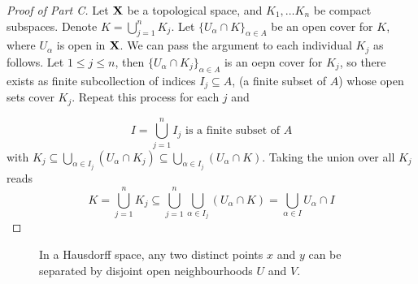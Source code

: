 \documentclass[../main-manifolds.tex]{subfiles}
\begin{document}
\begin{proof}[Proof of  Part C]
    Let ${\mathbf{X}}$ be a topological space, and $K_1,\ldots K_n$ be compact subspaces. Denote $K = \bigcup_{j=1}^n K_j$. Let $\{U_\alpha\cap K\}_{\alpha\in A}$ be an open cover for $K$, where $U_\alpha$ is open in ${\mathbf{X}}$. We can pass the argument to each individual $K_j$ as follows. Let $1\leq j\leq n$, then $\{U_\alpha\cap K_j\}_{\alpha\in A}$ is an oepn cover for $K_j$, so there exists as finite subcollection of indices $I_j\subseteq A$, (a finite subset of $A$) whose open sets cover $K_j$. Repeat this process for each $j$ and 

    \[
        I = \bigcup_{j=1}^n I_j \text{ is a finite subset of } A
    \]
    with $K_j\subseteq \bigcup_{\alpha\in I_j}(U_\alpha\cap K_j)\subseteq \bigcup_{\alpha\in I_j}(U_\alpha\cap K)$. Taking the union over all $K_j$ reads
    \[
        K = \bigcup_{j=1}^n K_j\subseteq \bigcup_{j=1}^n \bigcup_{\alpha\in I_j}(U_\alpha\cap K)=\bigcup_{\alpha\in I}U_\alpha\cap I
    \]
\end{proof}
\begin{figure}[htbp]
        \centering
        \caption{In a Hausdorff space, any two distinct points $x$ and $y$ can be separated by disjoint open neighbourhoods $U$ and $V$.}
        \label{lee-appendix-A.45D Hausdorff}
    \end{figure}
\end{document}

